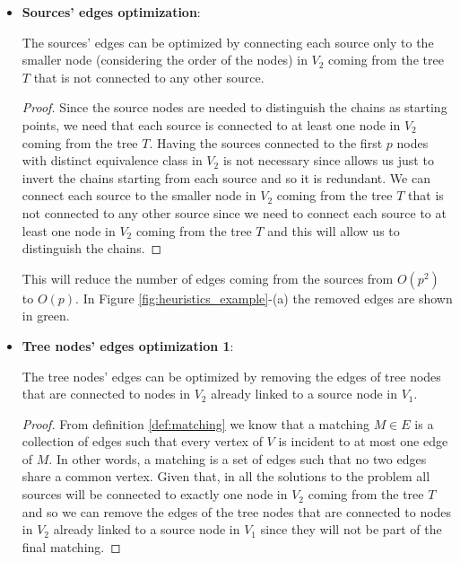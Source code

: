 \begin{itemize}
    \item \textbf{Sources' edges optimization}:
    \begin{lemma} \label{lemma:sources_optimization}
        The sources' edges can be optimized by connecting each source only to the smaller node (considering the order of the nodes) in $V_2$ coming from the tree $T$ that is not connected to any other source.
    \end{lemma}

    \begin{proof}
        Since the source nodes are needed to distinguish the chains as starting points, we need that each source is connected to at least one node in $V_2$ coming from the tree $T$. Having the sources connected to the first $p$ nodes with distinct equivalence class in $V_2$ is not necessary since allows us just to invert the chains starting from each source and so it is redundant. We can connect each source to the smaller node in $V_2$ coming from the tree $T$ that is not connected to any other source since we need to connect each source to at least one node in $V_2$ coming from the tree $T$ and this will allow us to distinguish the chains.
    \end{proof}

    This will reduce the number of edges coming from the sources from $O(p^2)$ to $O(p)$. In Figure \ref{fig:heuristics_example}-(a) the removed edges are shown in green.
    \item \textbf{Tree nodes' edges optimization 1}:
    \begin{lemma} \label{lemma:tree_optimization_1}
        The tree nodes' edges can be optimized by removing the edges of tree nodes that are connected to nodes in $V_2$ already linked to a source node in $V_1$.
    \end{lemma}

    \begin{proof}
        From definition \ref{def:matching} we know that a matching $M \in E$ is a collection of edges such that every vertex of $V$ is incident to at most one edge of $M$. In other words, a matching is a set of edges such that no two edges share a common vertex. Given that, in all the solutions to the problem all sources will be connected to exactly one node in $V_2$ coming from the tree $T$ and so we can remove the edges of the tree nodes that are connected to nodes in $V_2$ already linked to a source node in $V_1$ since they will not be part of the final matching.
    \end{proof}


\end{itemize}
